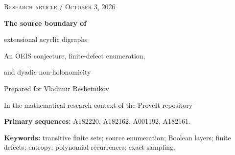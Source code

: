 \documentclass[11pt,a4paper]{article}
\theoremstyle{definition}
\begin{document}
\hypersetup{pageanchor=false}
\begin{titlepage}
\thispagestyle{empty}
\vspace*{8mm}
{\color{MidnightBlue}\large\textsc{Research article \quad / \quad October 3, 2026}}\par
\vspace{13mm}
{\LARGE\bfseries The source boundary of\par extensional acyclic digraphs}\par
\vspace{6mm}
{\Large An OEIS conjecture, finite-defect enumeration,\par and dyadic non-holonomicity}\par
\vspace{10mm}
{\large Prepared for Vladimir Reshetnikov}\par
\vspace{3mm}
{\normalsize In the mathematical research context of the ProveIt repository}
\vspace{12mm}
\begin{abstract}
An extensional acyclic digraph has pairwise distinct out-neighborhoods.
We give a self-contained proof of the formula
$a(n)=n-\lceil\log_2n\rceil$ for its maximum possible number of sources,
the formula still marked conjectural in OEIS A182220 when consulted.
The pigeonhole upper bound is already present in Tomescu's 2011 thesis;
we credit that fact and do not present it as a new discovery.

The main development concerns the boundary of the source-count triangle
A182162. If $u_m=\mathrm{A001192}(m)$, $q=\lceil\log_2 n\rceil$, and
$b_n^{(d)}$ counts isomorphism classes with exactly $n-q-d$ sources,
we obtain an exact $(d+1)$-term formula and, in particular,
$b_n^{(0)}=u_q\binom{2^q-q}{n-q}$.
A uniform covering estimate then proves a dyadic entropy law for every
fixed $d$. The complete set of subsequential exponential growth rates
is an explicit interval, equal to $[1,4]$ when $d=0$.
The exponential jumps across powers of two imply that none of these
boundary sequences is P-recursive. Consequently their ordinary generating
functions are not D-finite.

We also give an all-orders expansion of the Boolean-subset factor,
retaining the small-core count exactly, and a total-variation binomial
law for the number of missing arcs near a complete Boolean layer.
The proofs are accompanied by independently implemented counting
recurrences and exhaustive small-graph checks. These are conventional
mathematical proofs with computational tests, not Lean-verified results.
Historical priority for the boundary refinements is not established.
\end{abstract}
\vfill
\noindent\small
\textbf{Primary sequences:} A182220, A182162, A001192, A182161.\par
\textbf{Keywords:} transitive finite sets; source enumeration; Boolean layers;
finite defects; entropy; polynomial recurrences; exact sampling.
\end{titlepage}
\hypersetup{pageanchor=true}
\end{document}
